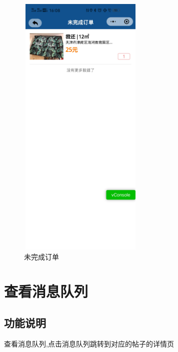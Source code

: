\begin{figure}[htbp]
\begin{minipage}[t]{0.48\textwidth}
    \includegraphics[width=6cm,height=13cm]{design/image/ui.png}
    \caption{未完成订单}
    \end{minipage}
    \end{figure}

\newpage

\section{查看消息队列}

\subsection{功能说明}
查看消息队列,点击消息队列跳转到对应的帖子的详情页
